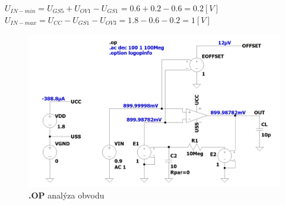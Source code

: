 \begin{center}
    \large
    \(
        U_{IN-min} = U_{GS5} + U_{OV1} - U_{GS1} = 0.6 + 0.2 - 0.6 = 0.2 [V]
    \)
    \(
        U_{IN-max} = U_{CC} - U_{GS1} - U_{OV3} = 1.8 - 0.6 - 0.2 = 1 [V]
    \)
\end{center}


\begin{figure}[h!]
    \centering
    \includegraphics[width=\textwidth]{text/img/OP-sch.png}
    \caption{\label{fig:res-OP-SCH} {\bf .OP} analýza obvodu}
\end{figure}

